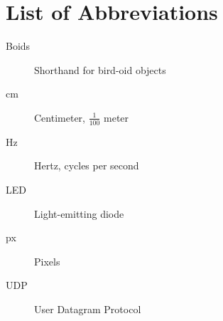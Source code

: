 \chapter*{List of Abbreviations}

\begin{description}
  \item[Boids] Shorthand for bird-oid objects
  \item[cm] Centimeter, $\frac{1}{100}$ meter
  \item[Hz] Hertz, cycles per second
  \item[LED] Light-emitting diode
  \item[px] Pixels
  \item[UDP] User Datagram Protocol
\end{description}
